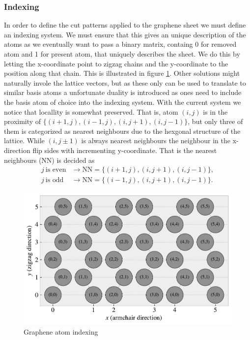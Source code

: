 \subsubsection{Indexing}

In order to define the cut patterns applied to the graphene sheet we must define an indexing system. We must ensure that this gives an
unique description of the atoms as we eventually want to pass a binary matrix, containg 0 for removed atom and 1 for present atom, that
uniquely describes the sheet. We do this by letting the x-coordinate point to zigzag chains and the y-coordinate to the position along that
chain. This is illustrated in figure \ref{fig:atom_indexing}. Other solutions might naturally invole the lattice vectors, but as these only
can be used to translate to similar basis atoms a unfortunate duality is introduced as ones need to include the basis atom of choice into
the indexing system. With the current system we notice that locallity is somewhat preserved. That is, atom $(i, j)$ is in the proximity of
$\{(i+1, j), (i-1, j), (i, j+1), (i, j-1)\}$, but only three of them is categorized as nearest neighbours due to the hexgonal structure of
the lattice. While $(i, j\pm 1)$ is always nearest neighbours the neighbour in the x-direction flip sides with incrementing y-coordinate.
That is the nearest neighbours (NN) is decided as
\begin{align*}
  j \ \text{is even} &\rightarrow \text{NN} = \{(i+1, j), (i, j+1), (i, j-1)\}, \\
  j \ \text{is odd} &\rightarrow \text{NN} = \{(i-1, j), (i, j+1), (i, j-1)\}.
\end{align*}

\begin{figure}[H]
  \centering
  \includegraphics[width=0.7\linewidth]{figures/atom_indexing.pdf}
  \caption{Graphene atom indexing}
  \label{fig:atom_indexing}
\end{figure}

